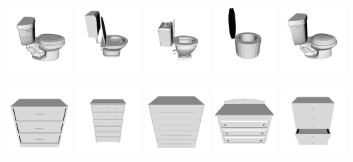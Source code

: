 \begin{figure}[!t]
	\includegraphics[width=0.15\textwidth]{Figures/ObjRecog/toilet_0}\hfill
	\includegraphics[width=0.15\textwidth]{Figures/ObjRecog/toilet_1}\hfill
	\includegraphics[width=0.15\textwidth]{Figures/ObjRecog/toilet_2}\hfill
	\includegraphics[width=0.15\textwidth]{Figures/ObjRecog/toilet_3}\hfill
	\includegraphics[width=0.15\textwidth]{Figures/ObjRecog/toilet_4}\hfill

	\includegraphics[width=0.15\textwidth]{Figures/ObjRecog/dresser_0}\hfill
	\includegraphics[width=0.15\textwidth]{Figures/ObjRecog/dresser_1}\hfill
	\includegraphics[width=0.15\textwidth]{Figures/ObjRecog/dresser_2}\hfill
	\includegraphics[width=0.15\textwidth]{Figures/ObjRecog/dresser_3}\hfill
	\includegraphics[width=0.15\textwidth]{Figures/ObjRecog/dresser_4}\hfill
	

\end{figure}
